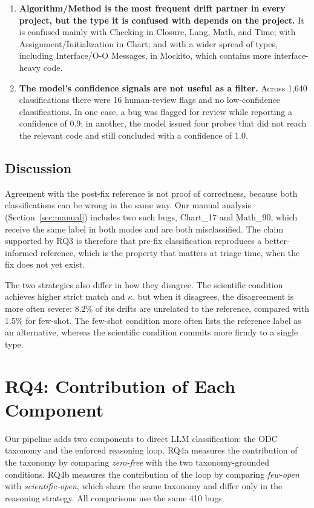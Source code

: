 \documentclass{iutbscthesis}
\begin{document}
\begin{enumerate}
    \item \textbf{Algorithm/Method is the most frequent drift partner in every project, but the type it is confused with depends on the project.} It is confused mainly with Checking in Closure, Lang, Math, and Time; with Assignment/\allowbreak Initialization in Chart; and with a wider spread of types, including Interface/\allowbreak O-O Messages, in Mockito, which contains more interface-heavy code.
    \item \textbf{The model's confidence signals are not useful as a filter.} Across 1{,}640 classifications there were 16 human-review flags and no low-confidence classifications. In one case, a bug was flagged for review while reporting a confidence of 0.9; in another, the model issued four probes that did not reach the relevant code and still concluded with a confidence of 1.0.
\end{enumerate}

\subsection{Discussion}

Agreement with the post-fix reference is not proof of correctness, because both classifications can be wrong in the same way. Our manual analysis (Section~\ref{sec:manual}) includes two such bugs, Chart\_17 and Math\_90, which receive the same label in both modes and are both misclassified. The claim supported by RQ3 is therefore that pre-fix classification reproduces a better-informed reference, which is the property that matters at triage time, when the fix does not yet exist.

The two strategies also differ in how they disagree. The scientific condition achieves higher strict match and $\kappa$, but when it disagrees, the disagreement is more often severe: 8.2\% of its drifts are unrelated to the reference, compared with 1.5\% for few-shot. The few-shot condition more often lists the reference label as an alternative, whereas the scientific condition commits more firmly to a single type.

\section{RQ4: Contribution of Each Component}

Our pipeline adds two components to direct LLM classification: the ODC taxonomy and the enforced reasoning loop. RQ4a measures the contribution of the taxonomy by comparing \textit{zero-free} with the two taxonomy-grounded conditions. RQ4b measures the contribution of the loop by comparing \textit{few-open} with \textit{scientific-open}, which share the same taxonomy and differ only in the reasoning strategy. All comparisons use the same 410 bugs.
\end{document}
